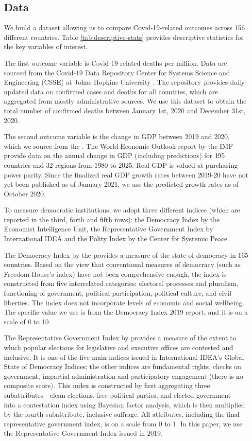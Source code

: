 
\subsection{Data}
We build a dataset allowing us to compare Covid-19-related outcomes across 156 different countries. Table \ref{tab:descriptive-stats} provides descriptive statistics for the key variables of interest. 

The first outcome variable is Covid-19-related deaths per million. Data are sourced from the Covid-19 Data Repository Center for Systems Science and Engineering (CSSE) at Johns Hopkins University \citep{covid-data}. The repository provides daily-updated data on confirmed cases and deaths for all countries, which are aggregated from mostly administrative sources. We use this dataset to obtain the total number of confirmed deaths between January 1st, 2020 and December 31st, 2020. 

The second outcome variable is the change in GDP between 2019 and 2020, which we source from the \citet{imf}. The World Economic Outlook report by the IMF provide data on the annual change in GDP (including predictions) for 195 countries and 32 regions from 1980 to 2025. Real GDP is valued at purchasing power parity. Since the finalized real GDP growth rates between 2019-20 have not yet been published as of January 2021, we use the predicted growth rates as of October 2020. 

To measure democratic institutions, we adopt three different indices (which are reported in the third, forth and fifth rows): the Democracy Index by the Economist Intelligence Unit, the Representative Government Index by International IDEA and the Polity Index by the Center for Systemic Peace. 

The Democracy Index by the \citet{eiu} provides a measure of the state of democracy in 165 countries. Based on the view that conventional measures of democracy (such as Freedom House's index) have not been comprehensive enough, the index is constructed from five interrelated categories: electoral processes and pluralism, functioning of government, political participation, political culture, and civil liberties. The index does not incorporate levels of economic and social wellbeing. The specific value we use is from the Democracy Index 2019 report, and it is on a scale of 0 to 10. 
    
The Representative Government Index by \citet{gsd} provides a measure of the extent to which popular elections for legislative and executive offices are contested and inclusive. It is one of the five main indices issued in International IDEA's Global State of Democracy Indices; the other indices are fundamental rights, checks on government, impartial administration and participatory engagement (there is no composite score). This index is constructed by first aggregating three subattributes - clean elections, free political parties, and elected government - into a contestation index using Bayesian factor analysis, which is then multiplied by the fourth subattribute, inclusive suffrage. All attributes, including the final representative government index, is on a scale from 0 to 1. In this paper, we use the Representative Government Index issued in 2019. 
    
